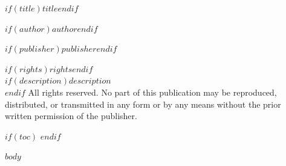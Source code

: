 \documentclass[$if(fontsize)$$fontsize$,$endif$$if(classoption)$$classoption$,$endif$]{$if(documentclass)$$documentclass$$else$book$endif$}
\begin{document}
\begin{titlepage}
  \centering
  \vspace*{2in}
  {\Huge\bfseries $if(title)$$title$$endif$\par}
  \vspace{0.5in}
  {\large $if(author)$$author$$endif$\par}
  \vfill
  {\normalsize $if(publisher)$$publisher$$endif$\par}
\end{titlepage}

\thispagestyle{empty}
\vspace*{\fill}
\noindent
$if(rights)$$rights$$endif$\\[6pt]
$if(description)$\textit{$description$}\\[6pt]$endif$
All rights reserved. No part of this publication may be reproduced, distributed,
or transmitted in any form or by any means without the prior written permission
of the publisher.
\vspace*{\fill}
\newpage

$if(toc)$
{\hypersetup{linkcolor=black}\setcounter{tocdepth}{$toc-depth$}\tableofcontents\newpage}
$endif$

$body$
\end{document}
